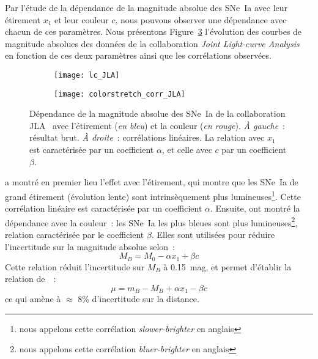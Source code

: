 \documentclass[../main/main.tex]{subfiles}
\begin{document}
Par l'étude de la dépendance de la magnitude absolue des SNe~Ia avec leur
étirement $x_1$ et leur couleur $c$, nous pouvons observer une dépendance
avec chacun de ces paramètres. Nous présentons Figure~\ref{fig:mxc} l'évolution
des courbes de magnitude absolues des données de la collaboration \textit{Joint
Light-curve Analysis}~\citep[JLA,][]{betoule2014} en fonction de ces deux
paramètres ainsi que les corrélations observées.

\begin{figure}[]
    \centering
    \begin{subfigure}[c]{.48\linewidth}
        \centering
        \texttt{[image: lc\_JLA]}
        \label{fig:mxca}
    \end{subfigure}
    \begin{subfigure}[c]{.48\linewidth}
        \centering
        \texttt{[image: colorstretch\_corr\_JLA]}
        \label{fig:mxcb}
    \end{subfigure}
    \caption[Dépendance de la magnitude absolue des SNe~Ia de la collaboration
    JLA avec l'étirement et la couleur]{Dépendance de la magnitude absolue des
        SNe~Ia de la collaboration JLA~\citep{betoule2014} avec l'étirement
        (\textit{en bleu}) et la couleur (\textit{en rouge}). \textit{À
        gauche}~: résultat brut. \textit{À droite}~: corrélations linéaires. La
        relation avec $x_1$ est caractérisée par un coefficient $\alpha$, et
    celle avec $c$ par un coefficient $\beta$.}\label{fig:mxc}
\end{figure}

\cite{phillips1993} a montré en premier lieu l'effet avec l'étirement, qui
montre que les SNe~Ia de grand étirement (évolution lente) sont intrinsèquement
plus lumineuses\footnote{nous appelons cette corrélation
\textit{slower-brighter} en anglais}. Cette corrélation linéaire est
caractérisée par un coefficient $\alpha$. Ensuite, \cite{hamuy1996} ont montré
la dépendance avec la couleur~: les SNe~Ia les plus bleues sont plus
lumineuses\footnote{nous appelons cette corrélation \textit{bluer-brighter} en
anglais}, relation caractérisée par le coefficient $\beta$. Elles sont utilisées
pour réduire l'incertitude sur la magnitude absolue selon~:
\begin{equation}\label{eq:mxc}
    M_B = M_0 - \alpha x_1 + \beta c
\end{equation}
Cette relation réduit l'incertitude sur $M_B$ à \SI{0.15}{mag}, et permet
d'établir la relation de~\cite{tripp1998}~:
\begin{equation}
    \mu = m_B - M_B + \alpha x_1 - \beta c
\end{equation}
ce qui amène à $\approx$ 8\% d'incertitude sur la distance.
\end{document}
